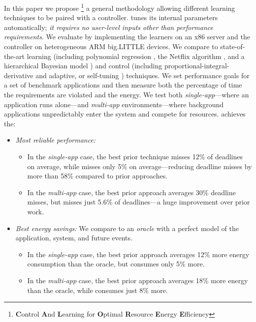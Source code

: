 In this paper we propose \SYSTEM{}\footnote{\textbf{C}ontrol
  \textbf{A}nd \textbf{L}earning for \textbf{O}ptimal
  \textbf{R}esource \textbf{E}nergy \textbf{E}fficiency} a general
methodology allowing different learning techniques to be paired with a
controller.  \SYSTEM{} tunes its internal parameters automatically;
\ie{} \emph{it requires no user-level inputs other than performance
  requirements}.
We evaluate \SYSTEM{} by implementing the learners on an x86 server
and the controller on heterogeneous ARM big.LITTLE devices.  We
compare to state-of-the-art learning (including polynomial regression
\cite{Koala,dubach2010}, the Netflix algorithm \cite{netflix,Paragon},
and a hierarchical Bayesian model \cite{LEO}) and control (including
proportional-integral-derivative \cite{Hellerstein2004a} and adaptive,
or self-tuning \cite{HandbookControl}) techniques.  We set performance
goals for a set of benchmark applications and then measure both the
percentage of time the requirements are violated and the energy.  We
test both \emph{single-app}---where an application runs alone---and
\emph{multi-app} environments---where background applications
unpredictably enter the system and compete for resources.  \SYSTEM{}
achieves the:
\begin{itemize}[leftmargin=1em]
\item \textit{Most reliable performance:}
  \begin{itemize}[leftmargin=1em]
  \item In the \emph{single-app} case, the best prior technique misses
    12\% of deadlines on average, while \SYSTEM{} misses only 5\% on
    average---reducing deadline misses by more than 58\% compared to
    prior approaches.
  \item In the \emph{multi-app} case, the best prior approach averages
    30\% deadline misses, but \SYSTEM{} misses just 5.6\% of
    deadlines---a huge improvement over prior work.
  \end{itemize}
\item \textit{Best energy savings:} We compare to an \emph{oracle}
  with a perfect model of the application, system, and future events.
  \begin{itemize}[leftmargin=1em]
  \item In the \emph{single-app} case, the best prior approach
    averages 12\% more energy consumption than the oracle, but
    \SYSTEM{} consumes only 5\% more.
  \item In the \emph{multi-app} case, the best prior approach averages
    18\% more energy than the oracle, while \SYSTEM{} consumes just
    8\% more.
  \end{itemize}
\end{itemize}

